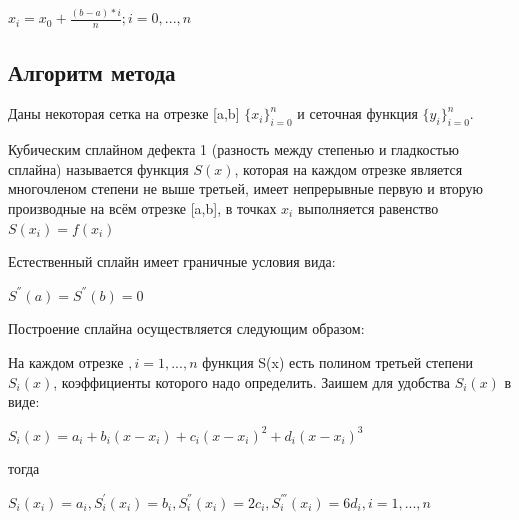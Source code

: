 \begin{math} 
	x_{i}=x_{0}+\frac{(b-a)*i}{n}; i=0,...,n
\end{math}

\subsection{Алгоритм метода}

Даны некоторая сетка на отрезке [a,b]
\begin{math} 
	\{x_{i}\}_{i=0}^{n}
\end{math}
и сеточная функция
\begin{math} 
	\{y_{i}\}_{i=0}^{n}
\end{math}. 

Кубическим сплайном дефекта 1 (разность между степенью и гладкостью сплайна) называется функция 
\begin{math} 
	S(x)
\end{math}, которая на каждом отрезке является многочленом степени не выше третьей, имеет непрерывные первую и вторую производные на всём отрезке [a,b], в точках \begin{math} 
x_{i}
\end{math} выполняется равенство 
\begin{math} 
	S(x_{i})=f(x_{i})
\end{math}

Естественный сплайн имеет граничные условия вида: 

\begin{math} 
	S^{''}(a)=S^{''}(b)=0
\end{math}

Построение сплайна осуществляется следующим образом: 

На каждом отрезке 
\begin{math} 
	[x_{i-1};x_{i}], i=1,...,n
\end{math}
функция S(x) есть полином третьей степени 
\begin{math} 
	S_{i}(x)
\end{math}, коэффициенты которого надо определить. Заишем для удобства \begin{math} 
S_{i}(x)
\end{math} в виде:

\begin{math} 
	S_{i}(x)=a_{i}+b_{i}(x-x_{i})+c_{i}(x-x_{i})^{2}+d_{i}(x-x_{i})^{3}
\end{math} 

тогда

\begin{math} 
	S_{i}(x_{i})=a_{i}, S_{i}^{'}(x_{i})=b_{i},S_{i}^{''}(x_{i})=2c_{i}, S_{i}^{'''}(x_{i})=6d_{i}, i=1,...,n
\end{math}

